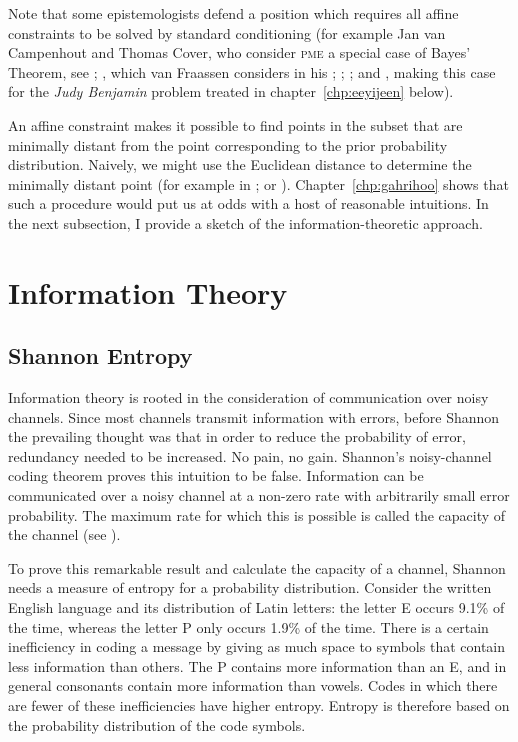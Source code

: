 \documentclass[phd,12pt,oneside]{ubcthesis}
\begin{document}
Note that some epistemologists defend a position which requires all
affine constraints to be solved by standard conditioning (for example
Jan van Campenhout and Thomas Cover, who consider \textsc{pme} a
special case of Bayes' Theorem, see ;
, which van Fraassen considers  in his ;
; ; and
, making this case for the \emph{Judy
  Benjamin} problem treated in chapter~\ref{chp:eeyijeen} below).

An affine constraint makes it possible to find points in the subset
that are minimally distant from the point corresponding to the prior
probability distribution. Naively, we might use the Euclidean distance
to determine the minimally distant point (for example in
; or ).
Chapter~\ref{chp:gahrihoo} shows that such a procedure would put us at
odds with a host of reasonable intuitions. In the next subsection, I
provide a sketch of the information-theoretic approach.

\section{Information Theory}
\label{sec:oxiequei}

\subsection{Shannon Entropy}
\label{subsec:thahcubu}

Information theory is rooted in the consideration of communication
over noisy channels. Since most channels transmit information with
errors, before Shannon the prevailing thought was that in order to
reduce the probability of error, redundancy needed to be increased. No
pain, no gain. Shannon's noisy-channel coding theorem proves this
intuition to be false. Information can be communicated over a noisy
channel at a non-zero rate with arbitrarily small error probability.
The maximum rate for which this is possible is called the capacity of
the channel (see ).

To prove this remarkable result and calculate the capacity of a
channel, Shannon needs a measure of entropy for a probability
distribution. Consider the written English language and its
distribution of Latin letters: the letter E occurs 9.1\% of the time,
whereas the letter P only occurs 1.9\% of the time. There is a certain
inefficiency in coding a message by giving as much space to symbols
that contain less information than others. The P contains more
information than an E, and in general consonants contain more
information than vowels. Codes in which there are fewer of these
inefficiencies have higher entropy. Entropy is therefore based on the
probability distribution of the code symbols. 
\end{document}
